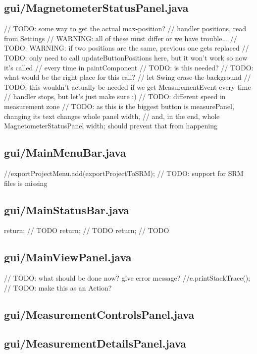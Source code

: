 \subsection{gui/MagnetometerStatusPanel.java}
    // TODO: some way to get the actual max-position?
    // handler positions, read from Settings
    // WARNING: all of these must differ or we have trouble...
        // TODO: WARNING: if two positions are the same, previous one gets replaced
        // TODO: only need to call updateButtonPositions here, but it won't work so now it's called
        // every time in paintComponent
        // TODO: is this needed?
        // TODO: what would be the right place for this call?
        // let Swing erase the background
                // TODO: this wouldn't actually be needed if we get MeasurementEvent every time
                // handler stops, but let's just make sure :)
                // TODO: different speed in measurement zone
            // TODO: as this is the biggest button is measurePanel, changing its text changes whole panel width,
            // and, in the end, whole MagnetometerStatusPanel width; should prevent that from happening

\subsection{gui/MainMenuBar.java}
            //exportProjectMenu.add(exportProjectToSRM);    // TODO: support for SRM files is missing

\subsection{gui/MainStatusBar.java}
        return; // TODO
        return; // TODO
        return; // TODO

\subsection{gui/MainViewPanel.java}
                    // TODO: what should be done now? give error message?
                    //e.printStackTrace();
        // TODO: make this as an Action?

\subsection{gui/MeasurementControlsPanel.java}

\subsection{gui/MeasurementDetailsPanel.java}

